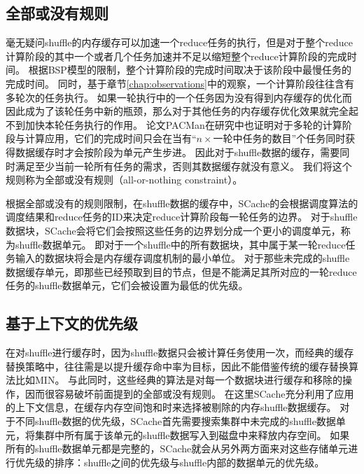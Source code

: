 \subsection{全部或没有规则}

毫无疑问shuffle的内存缓存可以加速一个reduce任务的执行，但是对于整个reduce计算阶段的其中一个或者几个任务加速并不足以缩短整个reduce计算阶段的完成时间。
根据BSP模型的限制，整个计算阶段的完成时间取决于该阶段中最慢任务的完成时间。
同时，基于章节\ref{chap:observations}中的观察，一个计算阶段往往含有多轮次的任务执行。
如果一轮执行中的一个任务因为没有得到内存缓存的优化而因此成为了该轮任务中新的瓶颈，那么对于其他任务的内存缓存优化效果就完全起不到加快本轮任务执行的作用。
论文PACMan\cite{pacman}在研究中也证明对于多轮的计算阶段与计算应用，它们的完成时间只会在当有“$n \times$一轮中任务的数目”个任务同时获得数据缓存时才会按阶段为单元产生步进。
因此对于shuffle数据的缓存，需要同时满足至少当前一轮所有任务的需求，否则其数据缓存就没有意义。
我们将这个规则称为全部或没有规则（all-or-nothing constraint）。

根据全部或没有的规则限制，在shuffle数据的缓存中，SCache的会根据调度算法的调度结果和reduce任务的ID来决定reduce计算阶段每一轮任务的边界。
对于shuffle数据块，SCache会将它们会按照这些任务的边界划分成一个更小的调度单元，称为shuffle数据单元。
即对于一个shuffle中的所有数据块，其中属于某一轮reduce任务输入的数据块将会是内存缓存调度机制的最小单位。
对于那些未完成的shuffle数据缓存单元，即那些已经预取到目的节点，但是不能满足其所对应的一轮reduce任务的shuffle数据单元，它们会被设置为最低的优先级。


\subsection{基于上下文的优先级}

在对shuffle进行缓存时，因为shuffle数据只会被计算任务使用一次，而经典的缓存替换策略中，往往需是以提升缓存命中率为目标，因此不能借鉴传统的缓存替换算法比如MIN\cite{min}。
与此同时，这些经典的算法是对每一个数据块进行缓存和移除的操作，因而很容易破坏前面提到的全部或没有规则。
在这里SCache充分利用了应用的上下文信息，在缓存内存空间饱和时来选择被剔除的内存shuffle数据缓存。
对于不同shuffle数据的优先级，SCache首先需要搜索集群中未完成的shuffle数据单元，将集群中所有属于该单元的shuffle数据写入到磁盘中来释放内存空间。
如果所有的shuffle数据单元都是完整的，SCache就会从另外两方面来对这些存储单元进行优先级的排序：shuffle之间的优先级与shuffle内部的数据单元的优先级。

